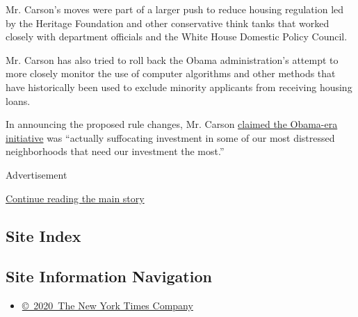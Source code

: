 Mr. Carson's moves were part of a larger push to reduce housing
regulation led by the Heritage Foundation and other conservative think
tanks that worked closely with department officials and the White House
Domestic Policy Council.

Mr. Carson has also tried to roll back the Obama administration's
attempt to more closely monitor the use of computer algorithms and other
methods that have historically been used to exclude minority applicants
from receiving housing loans.

In announcing the proposed rule changes, Mr. Carson
\href{https://www.nytimes.com/2020/01/03/us/politics/trump-housing-segregation.html}{claimed
the Obama-era initiative} was ``actually suffocating investment in some
of our most distressed neighborhoods that need our investment the
most.''

Advertisement

\protect\hyperlink{after-bottom}{Continue reading the main story}

\hypertarget{site-index}{%
\subsection{Site Index}\label{site-index}}

\hypertarget{site-information-navigation}{%
\subsection{Site Information
Navigation}\label{site-information-navigation}}

\begin{itemize}
\tightlist
\item
  \href{https://help.nytimes.com/hc/en-us/articles/115014792127-Copyright-notice}{©~2020~The
  New York Times Company}
\end{itemize}

